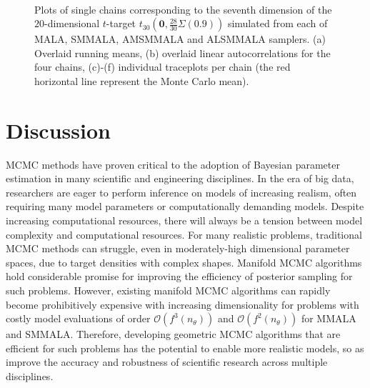 \documentclass[twoside,11pt]{article}
\begin{document}
\begin{figure}
{	}
	 \\
	\caption{Plots of single chains corresponding to the seventh dimension of the $20$-dimensional $t$-target
		$t_{30}(\mathbf{0},\frac{28}{30}\Sigma(0.9))$ simulated from each of MALA, SMMALA, AMSMMALA and ALSMMALA samplers. (a) 
		Overlaid running means, (b) overlaid linear autocorrelations for the four chains, (c)-(f) individual traceplots per 
		chain (the red horizontal line represent the Monte Carlo mean).}
	\label{fig:t}
\end{figure}

\newpage
\section{Discussion}

MCMC methods have proven critical to the adoption of Bayesian parameter estimation in many scientific and engineering 
disciplines. In the era of big data, researchers are eager to perform inference on models of increasing realism, often 
requiring many model parameters or computationally demanding models. Despite increasing computational resources, there will 
always be a tension between model complexity and computational resources. For many realistic problems, traditional MCMC 
methods can struggle, even in moderately-high dimensional parameter spaces, due to target densities with complex shapes.  
Manifold MCMC algorithms hold considerable promise for improving the efficiency of posterior sampling for such problems.  
However, existing manifold MCMC algorithms can rapidly become prohibitively expensive with increasing dimensionality for 
problems with costly model evaluations of order $\mathcal{O}(f^3(n_{\theta}))$ and $\mathcal{O}(f^2(n_{\theta}))$ for 
MMALA and SMMALA. Therefore, developing geometric MCMC algorithms that are efficient for such problems has the potential to 
enable more realistic models, so as improve the accuracy and robustness of scientific research across multiple disciplines. 
\end{document}
